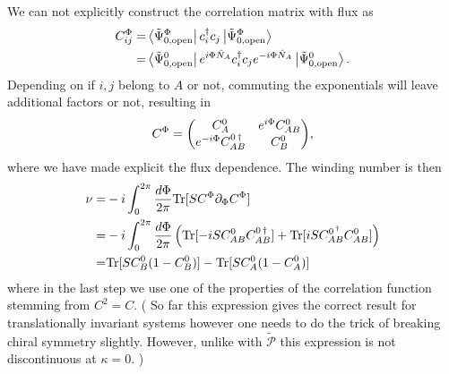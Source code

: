 \documentclass[twocolumn,amsmath,longbibliography,amssymb,superscriptaddress]{revtex4-1}
\newcommand{\carlos}[1]{{\color{red} #1}}
\begin{document}
We can not explicitly construct the correlation matrix with flux as
\begin{align*}
C_{ij}^\Phi =& \bra{\tilde{\Psi}_{0,{\rm open}}^\Phi}c_i^\dagger c_j \ket{\tilde{\Psi}_{0,{\rm open}}^\Phi} \\
=&\bra{\tilde{\Psi}_{0,{\rm open}}^0}e^{i\Phi \hat{N}_A} c_i^\dagger c_j e^{-i\Phi \hat{N}_A}\ket{\tilde{\Psi}_{0,{\rm open}}^0} .
\end{align*}
Depending on if $i,j$ belong to $A$ or not, commuting the exponentials will leave additional factors or not, resulting in
\begin{align*}
C^\Phi = \mqty(C_A^0 & e^{i\Phi} C_{AB}^0 \\e^{-i\Phi} C_{AB}^{0\,\dagger} &C_B^{0}),
\end{align*}
where we have made explicit the flux dependence. The winding number is then
\begin{align}
\nu =&  -i\int_0^{2\pi} \frac{d\Phi}{2\pi} {\rm Tr}[S C^\Phi \partial_\Phi C^\Phi] \\
=&  -i\int_0^{2\pi} \frac{d\Phi}{2\pi} \left( {\rm Tr}[-iS C_{AB}^0 C_{AB}^{0\,\dagger}]+{\rm Tr}[iS C_{AB}^{0\,^\dagger} C_{AB}^0] \right) \\
=&  {\rm Tr}[S C_B^0(1-C_B^0)]-{\rm Tr}[S C_A^0(1-C_A^0)] 
\end{align}
where in the last step we use one of the properties of the correlation function stemming from $C^2 = C$. (\carlos{So far this expression gives the correct result for translationally invariant systems however one needs to do the trick of breaking chiral symmetry slightly. However, unlike with $\tilde{\mathcal{P}}$ this expression is not discontinuous at $\kappa = 0$. })
\fi
\end{document}
